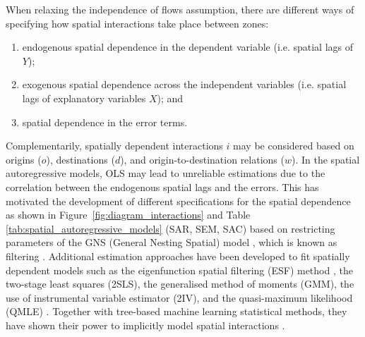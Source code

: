 When relaxing the independence of flows assumption, there are different ways of specifying how spatial interactions take place between zones: 
\begin{enumerate}
    \item endogenous spatial dependence in the dependent variable (i.e. spatial lags of $Y$);
    \item exogenous spatial dependence across the independent variables (i.e. spatial lags of explanatory variables $X$); and
    \item spatial dependence in the error terms.
\end{enumerate}
Complementarily, spatially dependent interactions $i$ may be considered based on origins ($o$), destinations ($d$), and origin-to-destination relations ($w$).
In the spatial autoregressive models, OLS may lead to unreliable estimations due to the correlation between the endogenous spatial lags and the errors. This has motivated the development of different specifications for the spatial dependence as shown in Figure~\ref{fig:diagram_interactions} and Table~ \ref{tab:spatial_autoregressive_models} (SAR, SEM, SAC) based on restricting parameters of the GNS (General Nesting Spatial) model \citep{Elhorst2014SpatialEconometrics}, which is known as filtering \citep{Anselin1988SpatialModels}. 
Additional estimation approaches have been developed to fit spatially dependent models such as the eigenfunction spatial filtering (ESF) method \citep{Fischer2008ModelingUnion}, the two-stage least squares (2SLS), the generalised method of moments (GMM), the use of instrumental variable estimator (2IV), and the quasi-maximum likelihood (QMLE) \citep{Qu2015EstimatingMatrix, Schatzmann2017SpatialMatrices}. Together with tree-based machine learning statistical methods, they have shown their power to implicitly model spatial interactions \citep{Credit2022SpatialAngeles}.


